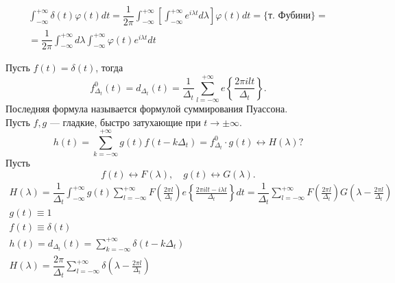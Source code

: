 \begin{gather*}
\int_{-\infty}^{+\infty} \delta(t) \varphi(t) dt = \dfrac{1}{2\pi} \int_{-\infty}^{+\infty}\left[ \int_{-\infty}^{+\infty} e^{i\lambda t} d\lambda\right] \varphi(t) dt = \{\text{т. Фубини}\} =\\
= \dfrac{1}{2\pi} \int_{-\infty}^{+\infty} d\lambda \int_{-\infty}^{+\infty} \varphi(t) e^{i\lambda t} dt
\end{gather*}
\begin{center}
\fbox{
$1 \longleftrightarrow 2\pi \delta(\lambda)$
}
\end{center}
Пусть $f(t) = \delta(t)$, тогда $$f_{\Delta_t}^0 (t) = d_{\Delta_t}(t) = \dfrac{1}{\Delta_t} \sum_{l = -\infty}^{+\infty} e \left\{\frac{2\pi i l t}{\Delta_t} \right\}.$$
Последняя формула называется формулой суммирования Пуассона.\\
Пусть $f,g$ --- гладкие, быстро затухающие при $t \to \pm \infty$.
$$h(t) = \sum_{k = -\infty}^{+\infty} g(t) f(t - k\Delta_t) = f_{\Delta_t}^0  \cdot g(t) \longleftrightarrow H(\lambda) ?$$
Пусть 
$$f(t) \longleftrightarrow F(\lambda), \quad g(t) \longleftrightarrow G(\lambda).$$
\begin{gather*}
H(\lambda) = \dfrac{1}{\Delta_t} \int_{-\infty}^{+\infty} g(t) \sum_{l = -\infty}^{+\infty} F\left(\frac{2\pi l}{\Delta_t}\right) e\left\{\frac{2 \pi i l t - i \lambda t}{\Delta_t} \right\} dt = \dfrac{1}{\Delta_t} \sum_{l =-\infty}^{+\infty} F \left( \frac{2\pi l}{\Delta_t} \right)G\left(\lambda - \frac{2\pi l}{\Delta_t} \right)\\
g(t) \equiv 1\\
f(t) \equiv \delta(t)\\
h(t) = d_{\Delta_t} (t) = \sum_{k = -\infty}^{+\infty} \delta(t - k\Delta_t)\\
H(\lambda) = \dfrac{2\pi}{\Delta_t} \sum_{l=-\infty}^{+\infty} \delta\left(\lambda - \frac{2 \pi l}{\Delta_t}\right)
\end{gather*}
\begin{center}
\end{center}
